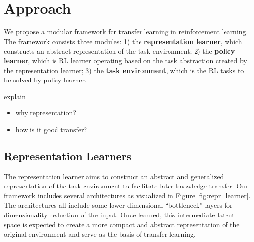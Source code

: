 \section{Approach}
\label{sec:approach}
We propose a modular framework for transfer learning in reinforcement learning. 
The framework consists three modules: 
1) the \textbf{representation learner}, which constructs an abstract representation of the task environment;
2) the \textbf{policy learner}, which is RL learner operating based on the task abstraction created by the representation learner;
3) the \textbf{task environment}, which is the RL tasks to be solved by policy learner.

explain 
\begin{itemize}
	\item why representation?
	\item how is it good transfer?
\end{itemize}

\subsection{Representation Learners}
The representation learner aims to construct an abstract and generalized representation of the task environment to facilitate later knowledge transfer.
Our framework includes several architectures as visualized in Figure \ref{fig:repr_learner}.
The architectures all include some lower-dimensional ``bottleneck'' layers for dimensionality reduction of the input.
Once learned, this intermediate latent space is expected to create a more compact and abstract representation of the original environment and serve as the basis of transfer learning. 

